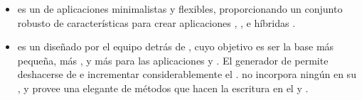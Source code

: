 \begin{itemize}
			\item
				\textbf{\expressjsNAME} es un \frameworkPC de aplicaciones \webINT \nodejsNAME minimalistas y flexibles, proporcionando un conjunto robusto de características  para crear aplicaciones \webINT \single, \multipage, e híbridas \cite{online_technology_expressjs_officialsite}.

			\item
				\textbf{\koaNAME} es un \frameworkPC \webINT diseñado por el equipo detrás de \expressjsNAME, cuyo objetivo es ser la base más pequeña, más \expressiveQA, y más \robustQA para las aplicaciones \webINT y \apisAS. El generador de \koaNAME permite deshacerse de \callbacksPL e incrementar considerablemente el \errorHandlingPL. \koaNAME no incorpora ningún \middlewareAS en su \coreAS, y provee una elegante \suitePC de métodos que hacen la escritura en el \serverAS \fastQA y \enjoyableQA \cite{online_technology_koa_officialsite}.

		\end{itemize}

